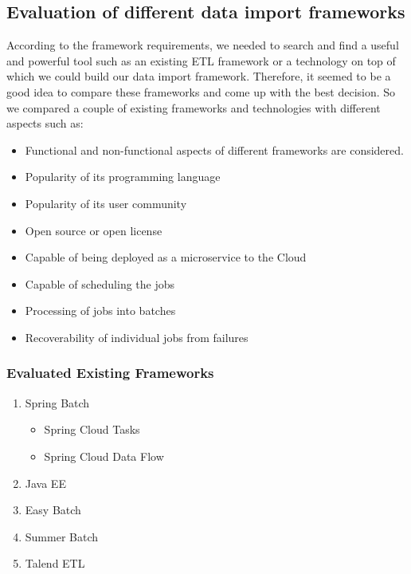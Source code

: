 \subsection{Evaluation of different data import
frameworks}\label{evaluation-of-different-data-import-frameworks}

According to the framework requirements, we needed to search and find a
useful and powerful tool such as an existing ETL framework or a
technology on top of which we could build our data import framework.
Therefore, it seemed to be a good idea to compare these frameworks and
come up with the best decision. So we compared a couple of existing
frameworks and technologies with different aspects such as:

\begin{itemize}
\tightlist
\item
  Functional and non-functional aspects of different frameworks are
  considered.
\item
  Popularity of its programming language
\item
  Popularity of its user community
\item
  Open source or open license
\item
  Capable of being deployed as a microservice to the Cloud
\item
  Capable of scheduling the jobs
\item
  Processing of jobs into batches
\item
  Recoverability of individual jobs from failures
\end{itemize}

\subsubsection{Evaluated Existing
Frameworks}\label{evaluated-existing-frameworks}

\begin{enumerate}
\def\labelenumi{\arabic{enumi}.}
\tightlist
\item
  Spring Batch

  \begin{itemize}
  \tightlist
  \item
    Spring Cloud Tasks
  \item
    Spring Cloud Data Flow
  \end{itemize}
\item
  Java EE
\item
  Easy Batch
\item
  Summer Batch
\item
  Talend ETL
\end{enumerate}

